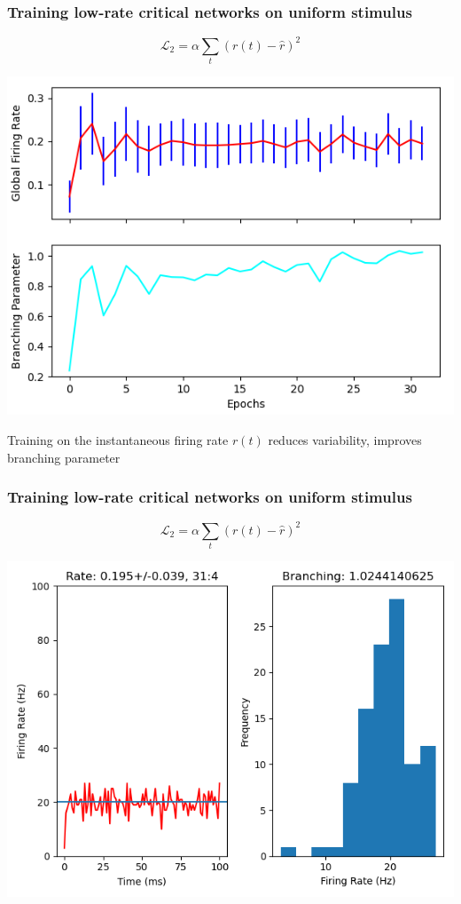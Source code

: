 \documentclass{beamer}
\begin{document}
\begin{frame}[plain]
\frametitle{Training low-rate critical networks on uniform stimulus} 

\begin{equation*}
\mathcal{L}_{2} = \alpha\sum_{t} (r(t) - \hat{r})^{2}
\end{equation*}

\begin{center}
\includegraphics[scale=0.5]{alpha-1ms-bin}
\end{center}

Training on the instantaneous firing rate $r(t)$ reduces variability, improves branching parameter

\end{frame}

\begin{frame}[plain]
\frametitle{Training low-rate critical networks on uniform stimulus} 

\begin{equation*}
\mathcal{L}_{2} = \alpha\sum_{t} (r(t) - \hat{r})^{2}
\end{equation*}

\begin{center}
\includegraphics[scale=0.5]{last-epoch}
\end{center}


\end{frame}
\end{document}
